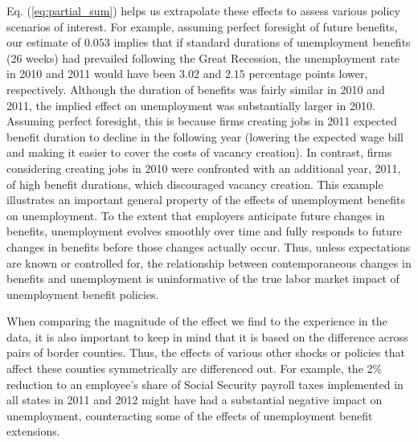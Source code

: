 \documentclass[12pt]{article}
\newcommand{\1}{\mathbf{1}}
\begin{document}
Eq. (\ref{eq:partial_sum}) helps us extrapolate these effects to assess various policy scenarios of interest. For example, assuming perfect foresight of future benefits, our estimate of $0.053$ implies that if standard durations of unemployment benefits (26 weeks) had prevailed following the Great Recession, the unemployment rate in 2010 and 2011 would have been $3.02$ and $2.15$ percentage points lower, respectively. Although the duration of benefits was fairly similar in 2010 and 2011, the implied effect on unemployment was substantially larger in 2010. Assuming perfect foresight, this is because firms creating jobs in 2011 expected benefit duration to decline in the following year (lowering the expected wage bill and making it easier to cover the costs of vacancy creation). In contrast, firms considering creating jobs in 2010 were confronted with an additional year, 2011, of high benefit durations, which discouraged vacancy creation. This example illustrates an important general property of the effects of unemployment benefits on unemployment. To the extent that employers anticipate future changes in benefits, unemployment evolves smoothly over time and fully responds to future changes in benefits before those changes actually occur. Thus, unless expectations are known or controlled for, the relationship between contemporaneous changes in benefits and unemployment is uninformative of the true labor market impact of unemployment benefit policies.

When comparing the magnitude of the effect we find to the experience in the data, it is also important to keep in mind that it is based on the difference across pairs of border counties. Thus, the effects of various other shocks or policies that affect these counties symmetrically are differenced out. For example, the 2\% reduction to an employee's share of Social Security payroll taxes implemented in all states in 2011 and 2012 might have had a substantial negative impact on unemployment, counteracting some of the effects of unemployment benefit extensions.
\end{document}
